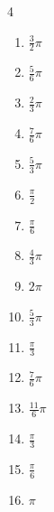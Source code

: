 \begin{multicols}{4}
\begin{enumerate}
  \item $\displaystyle \frac{3}{2}\pi$

  \item $\displaystyle \frac{5}{6}\pi$

  \item $\displaystyle \frac{2}{3}\pi$

  \item $\displaystyle \frac{7}{6}\pi$

\columnbreak %

\resetques

  \item $\displaystyle \frac{5}{3}\pi$

  \item $\displaystyle \frac{\pi}{2}$

  \item $\displaystyle \frac{\pi}{6}$

  \item $\displaystyle \frac{4}{3}\pi$

  \item $\displaystyle 2\pi$

  \item $\displaystyle \frac{5}{3}\pi$

  \item $\displaystyle \frac{\pi}{3}$

  \item $\displaystyle \frac{7}{6}\pi$

  \item $\displaystyle \frac{11}{6}\pi$

  \item $\displaystyle \frac{\pi}{3}$

  \item $\displaystyle \frac{\pi}{6}$

  \item $\displaystyle \pi$


\end{enumerate}
\end{multicols}
